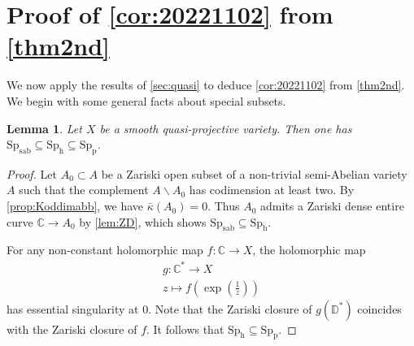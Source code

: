 \documentclass[11pt,english]{smfart}
\theoremstyle{plain}
\newtheorem{lem}[thm]{Lemma}
\theoremstyle{definition}
\theoremstyle{remark}
\numberwithin{equation}{section}
\theoremstyle{plain}
\newcommand{\bC}{\mathbb{C}}
\newcommand{\bD}{\mathbb{D}}
\newcommand{\Spab}{\mathrm{Sp}_{\mathrm{sab}}}
\newcommand{\Sph}{\mathrm{Sp}_{\mathrm{h}}}
\newcommand{\Spp}{\mathrm{Sp}_{\mathrm{p}}}
\begin{document}
	\section{Proof of \cref{cor:20221102} from \cref{thm2nd}}  
We now apply the results of \cref{sec:quasi} to deduce \cref{cor:20221102} from \cref{thm2nd}. We begin with some general facts about special subsets.
\begin{lem}\label{lem:inclusion} 
	Let $X$ be a smooth quasi-projective   variety. Then  one has  $\Spab\subseteq\Sph\subseteq\Spp$. 
\end{lem}
\begin{proof}
Let $A_0\subset A$ be a Zariski open subset of a non-trivial semi-Abelian variety $A$ such that the complement $A\backslash A_0$ has codimension at least two.
By \cref{prop:Koddimabb}, we have $\bar{\kappa}(A_0)=0$.
Thus $A_0$ admits a Zariski dense entire curve $\mathbb C\to A_0$ by \cref{lem:ZD}, which shows $\Spab\subseteq\Sph$.
	
	For any non-constant holomorphic map $f:\bC\to X$,   the holomorphic map 
	\begin{align*}
		g:\bC^*\to X\\
		z\mapsto f(\exp(\frac{1}{z}))
	\end{align*} has essential singularity at 0. Note that the Zariski closure of $g(\bD^*)$ coincides with the Zariski closure of $f$. It follows that   $\Sph\subseteq\Spp$. 
\end{proof}
\end{document}
